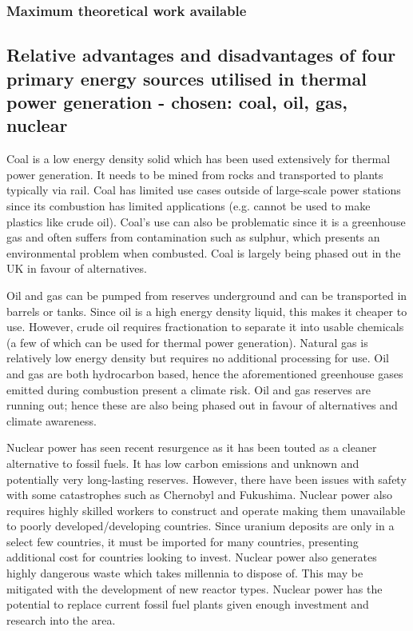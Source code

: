 \documentclass[11pt]{article}
\numberwithin{equation}{section}
\begin{document}
\subsubsection{Maximum theoretical work available}
\subsection{Relative advantages and disadvantages of four primary energy sources utilised in thermal power generation - chosen: coal, oil, gas, nuclear}
Coal is a low energy density solid which has been used extensively for thermal power generation. It needs to be mined from rocks and transported to plants typically via rail. Coal has limited use cases outside of large-scale power stations since its combustion has limited applications (e.g. cannot be used to make plastics like crude oil). Coal’s use can also be problematic since it is a greenhouse gas and often suffers from contamination such as sulphur, which presents an environmental problem when combusted. Coal is largely being phased out in the UK in favour of alternatives. 

Oil and gas can be pumped from reserves underground and can be transported in barrels or tanks. Since oil is a high energy density liquid, this makes it cheaper to use. However, crude oil requires fractionation to separate it into usable chemicals (a few of which can be used for thermal power generation). Natural gas is relatively low energy density but requires no additional processing for use. Oil and gas are both hydrocarbon based, hence the aforementioned greenhouse gases emitted during combustion present a climate risk. Oil and gas reserves are running out; hence these are also being phased out in favour of alternatives and climate awareness.

Nuclear power has seen recent resurgence as it has been touted as a cleaner alternative to fossil fuels. It has low carbon emissions and unknown and potentially very long-lasting reserves. However, there have been issues with safety with some catastrophes such as Chernobyl and Fukushima. Nuclear power also requires highly skilled workers to construct and operate making them unavailable to poorly developed/developing countries. Since uranium deposits are only in a select few countries, it must be imported for many countries, presenting additional cost for countries looking to invest. Nuclear power also generates highly dangerous waste which takes millennia to dispose of. This may be mitigated with the development of new reactor types. Nuclear power has the potential to replace current fossil fuel plants given enough investment and research into the area.
\end{document}
